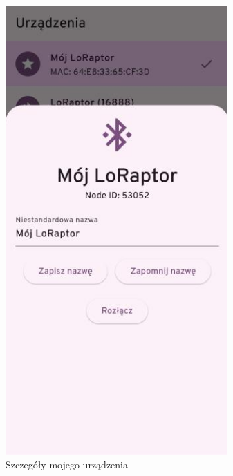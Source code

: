 \begin{figure}[H]
\begin{minipage}[b]{0.45\textwidth}
	\end{minipage}
	\hfill
	\begin{minipage}[b]{0.45\textwidth}
		\centering
		\includegraphics[width=\textwidth]{root/raptchat_my_device.png}
		\caption{Szczegóły mojego urządzenia}
	\end{minipage}
\end{figure}

